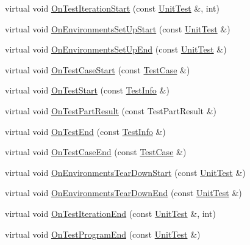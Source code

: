 \begin{DoxyCompactItemize}
\item 
virtual void \mbox{\hyperlink{classtesting_1_1_empty_test_event_listener_a836f05829855dc60d13ba99ad712c0dd}{On\+Test\+Iteration\+Start}} (const \mbox{\hyperlink{classtesting_1_1_unit_test}{Unit\+Test}} \&, int)
\item 
virtual void \mbox{\hyperlink{classtesting_1_1_empty_test_event_listener_a156d1965248fbdced6aabacadfa2d63f}{On\+Environments\+Set\+Up\+Start}} (const \mbox{\hyperlink{classtesting_1_1_unit_test}{Unit\+Test}} \&)
\item 
virtual void \mbox{\hyperlink{classtesting_1_1_empty_test_event_listener_abc481c6648d15d4242245195a06f5aa0}{On\+Environments\+Set\+Up\+End}} (const \mbox{\hyperlink{classtesting_1_1_unit_test}{Unit\+Test}} \&)
\item 
virtual void \mbox{\hyperlink{classtesting_1_1_empty_test_event_listener_ae4707ed9cc7ace5241bc8ccc4051209b}{On\+Test\+Case\+Start}} (const \mbox{\hyperlink{classtesting_1_1_test_case}{Test\+Case}} \&)
\item 
virtual void \mbox{\hyperlink{classtesting_1_1_empty_test_event_listener_a84fa74cc9ba742f9f847ea405ca84e5e}{On\+Test\+Start}} (const \mbox{\hyperlink{classtesting_1_1_test_info}{Test\+Info}} \&)
\item 
virtual void \mbox{\hyperlink{classtesting_1_1_empty_test_event_listener_a59e7f7d9f2e2d089a6e8c1e2577f4718}{On\+Test\+Part\+Result}} (const Test\+Part\+Result \&)
\item 
virtual void \mbox{\hyperlink{classtesting_1_1_empty_test_event_listener_afd58d21005f0d0d0399fb114627545d3}{On\+Test\+End}} (const \mbox{\hyperlink{classtesting_1_1_test_info}{Test\+Info}} \&)
\item 
virtual void \mbox{\hyperlink{classtesting_1_1_empty_test_event_listener_a6bec703158283104c4298f7d8a528515}{On\+Test\+Case\+End}} (const \mbox{\hyperlink{classtesting_1_1_test_case}{Test\+Case}} \&)
\item 
virtual void \mbox{\hyperlink{classtesting_1_1_empty_test_event_listener_a00fa1a4ea5831e20746188414268e7c6}{On\+Environments\+Tear\+Down\+Start}} (const \mbox{\hyperlink{classtesting_1_1_unit_test}{Unit\+Test}} \&)
\item 
virtual void \mbox{\hyperlink{classtesting_1_1_empty_test_event_listener_aea64c83c415b33a4c0b0239bafd1438d}{On\+Environments\+Tear\+Down\+End}} (const \mbox{\hyperlink{classtesting_1_1_unit_test}{Unit\+Test}} \&)
\item 
virtual void \mbox{\hyperlink{classtesting_1_1_empty_test_event_listener_a2253e5a18b3cf7bccd349567a252209d}{On\+Test\+Iteration\+End}} (const \mbox{\hyperlink{classtesting_1_1_unit_test}{Unit\+Test}} \&, int)
\item 
virtual void \mbox{\hyperlink{classtesting_1_1_empty_test_event_listener_a0abcc02bd2331a2e29ad6f4d9daf2a32}{On\+Test\+Program\+End}} (const \mbox{\hyperlink{classtesting_1_1_unit_test}{Unit\+Test}} \&)
\end{DoxyCompactItemize}


